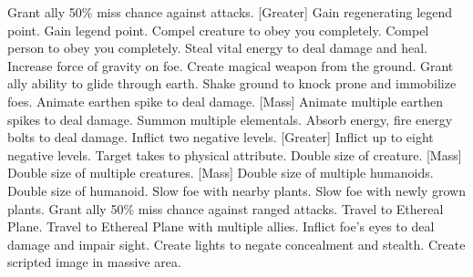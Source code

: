     {Grant ally 50\% miss chance against attacks.}
[Greater]
    {Gain regenerating legend point.}
    {Gain legend point.}
    {Compel creature to obey you completely.}
    {Compel person to obey you completely.}
    {Steal vital energy to deal damage and heal.}
    {Increase force of gravity on foe.}
    {Create magical weapon from the ground.}
    {Grant ally ability to glide through earth.}
    {Shake ground to knock prone and immobilize foes.}
    {Animate earthen spike to deal damage.}
[Mass]
    {Animate multiple earthen spikes to deal damage.}
    {Summon multiple elementals.}
    {Absorb energy, fire energy bolts to deal damage.}
    {Inflict two negative levels.}
[Greater]
    {Inflict up to eight negative levels.}
    {Target takes  to physical attribute.}
    {Double size of creature.}
[Mass]
    {Double size of multiple creatures.}
[Mass]
    {Double size of multiple humanoids.}
    {Double size of humanoid.}
    {Slow foe with nearby plants.}
    {Slow foe with newly grown plants.}
    {Grant ally 50\% miss chance against ranged attacks.}
    {Travel to Ethereal Plane.}
    {Travel to Ethereal Plane with multiple allies.}
    {Inflict foe's eyes to deal damage and impair sight.}
    {Create lights to negate concealment and stealth.}
    {Create scripted image in massive area.}
